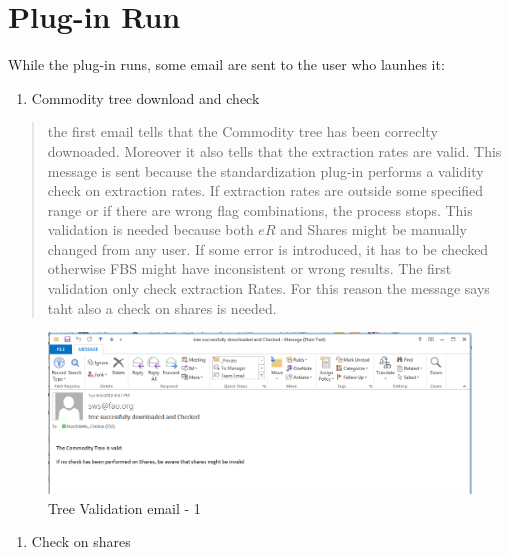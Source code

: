 \documentclass[]{article}
\providecommand{\tightlist}{%
  \setlength{\itemsep}{0pt}\setlength{\parskip}{0pt}}
\begin{document}
\section{Plug-in Run}\label{plug-in-run}

While the plug-in runs, some email are sent to the user who launhes it:

\begin{enumerate}
\def\labelenumi{\arabic{enumi}.}
\tightlist
\item
  Commodity tree download and check
\end{enumerate}

\begin{quote}
the first email tells that the Commodity tree has been correclty
downoaded. Moreover it also tells that the extraction rates are valid.
This message is sent because the standardization plug-in performs a
validity check on extraction rates. If extraction rates are outside some
specified range or if there are wrong flag combinations, the process
stops. This validation is needed because both \(eR\) and Shares might be
manually changed from any user. If some error is introduced, it has to
be checked otherwise FBS might have inconsistent or wrong results. The
first validation only check extraction Rates. For this reason the
message says taht also a check on shares is needed.
\end{quote}

\begin{figure}[H]

{\centering \includegraphics[width=1\linewidth]{images/standPlugin/31_email1} 

}

\caption{\label{fig:f31}Tree Validation email - 1}\label{fig:f31}
\end{figure}

\begin{enumerate}
\def\labelenumi{\arabic{enumi}.}
\setcounter{enumi}{1}
\tightlist
\item
  Check on shares
\end{enumerate}
\end{document}
